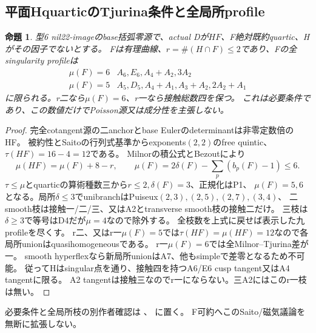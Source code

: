 \documentclass[a4paper,11pt]{ltjsarticle}
\newtheorem{proposition}{命題}[section]
\theoremstyle{definition}
\begin{document}
\subsection{平面HquarticのTjurina条件と全局所profile}
\begin{proposition}\label{prop:marked-quartic-numerical-entrance}
型6 nil22-imageのbase括弧零源で、actual Dが$HF$、F絶対既約quartic、Hがその因子でないとする。
Fは有理曲線、$r=\#(H\cap F)\le2$であり、Fの全singularity profileは
\[
\begin{array}{c|l}
 \mu(F)=6&A_6,E_6,A_4+A_2,3A_2\\
 \mu(F)=5&A_5,D_5,A_4+A_1,A_3+A_2,2A_2+A_1
\end{array}
\]
に限られる。r二なら$\mu(F)=6$、r一なら接触総数四を保つ。
これは必要条件であり、この数値だけでPoisson源又は成分性を主張しない。
\end{proposition}
\begin{proof}
完全cotangent源の二anchorとbase Eulerのdeterminantは非零定数倍のHF。
被約性とSaitoの行列式基準からexponents$(2,2)$のfree quintic、$\tau(HF)=16-4=12$である。
Milnorの積公式とBezoutにより
\[
 \mu(HF)=\mu(F)+8-r,\qquad
 \mu(F)=2\delta(F)-\sum_p(b_p(F)-1)\le6.
\]
$\tau\le\mu$とquarticの算術種数三から$r\le2,\delta(F)=3$、正規化はP1、
$\mu(F)=5,6$となる。局所$\delta\le3$でunibranchはPuiseux$(2,3),(2,5),(2,7),(3,4)$、
二smooth枝は接触一/二/三、又はA2とtransverse smooth枝の接触二だけ。
三枝は$\delta\ge3$で等号はD4だが$\mu=4$なので除外する。
全枝数を上式に戻せば表示した九profileを尽くす。
r二、又はr一$\mu(F)=5$では$\tau(HF)=\mu(HF)=12$なので各局所unionはquasihomogeneousである。
r一$\mu(F)=6$では全Milnor--Tjurina差が一。
smooth hyperflexなら新局所unionはA7、他もsimpleで差零となるため不可能。
従ってHはsingular点を通り、接触四を持つA6/E6 cusp tangent又はA4 tangentに限る。
A2 tangentは接触三なのでr一にならない。三A2にはこのr一枝は無い。
\end{proof}
必要条件と全局所枝の別作者確認は
、
に置く。
F可約へこのSaito/磁気議論を無断に拡張しない。
\end{document}
